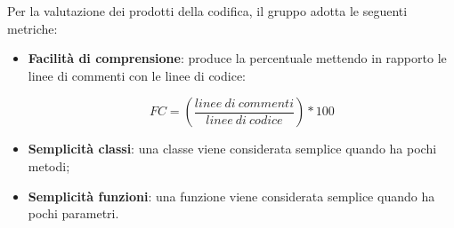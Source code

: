 Per la valutazione dei prodotti della codifica, il gruppo adotta le seguenti metriche:
\begin{itemize}
	\item \textbf{Facilità di comprensione}: produce la percentuale mettendo in rapporto le linee di commenti con le linee di codice:
\begin{center}
\[FC = \left(\frac{linee\ di\ commenti}{linee\ di\ codice}\right)*100\]
\end{center}
	\item \textbf{Semplicità classi}: una classe viene considerata semplice quando ha pochi metodi;
	\item \textbf{Semplicità funzioni}: una funzione viene considerata semplice quando ha pochi parametri.
\end{itemize}


